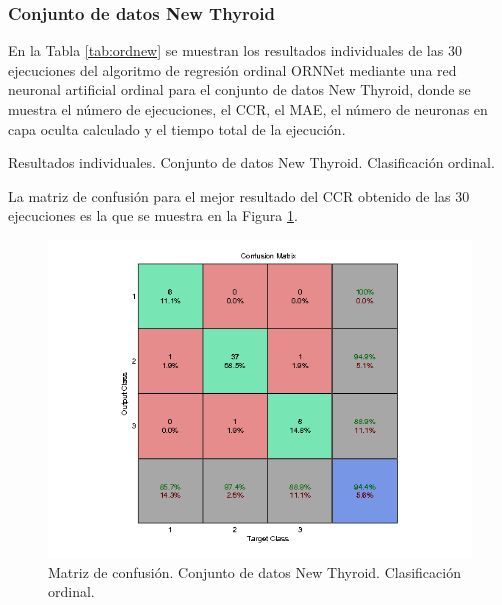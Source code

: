 			\subsubsection{Conjunto de datos New Thyroid}
			
			En la Tabla \ref{tab:ordnew} se muestran los resultados individuales de las 30 ejecuciones del algoritmo de regresión ordinal ORNNet mediante una red neuronal artificial ordinal para el conjunto de datos New Thyroid, donde se muestra el número de ejecuciones, el CCR, el MAE, el número de neuronas en capa oculta calculado y el tiempo total de la ejecución.\\
			
			\begin{table}[!htbp]
				\centering
				\caption{Resultados individuales. Conjunto de datos New Thyroid. Clasificación ordinal.}
				\label{tab:ordnew}
			\end{table}
			
			La matriz de confusión para el mejor resultado del CCR obtenido de las 30 ejecuciones es la que se muestra en la Figura \ref{fig:ordnew}.
			
			\begin{figure}[htbp]
				\centering
				\includegraphics[scale=0.8]{../src/results/ordinal/newthyroid_mc1.png}
				\caption{Matriz de confusión. Conjunto de datos New Thyroid. Clasificación ordinal.}
				\label{fig:ordnew}
			\end{figure}
			
